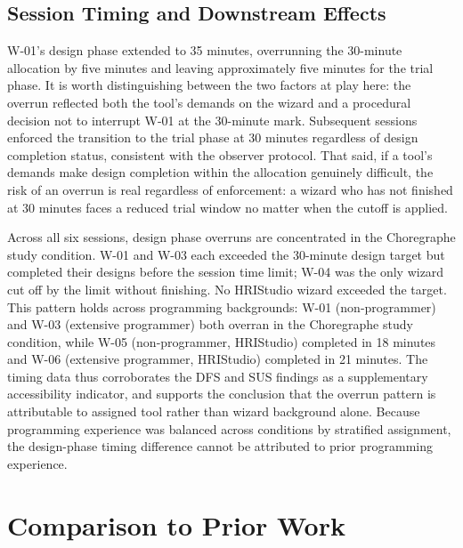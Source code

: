\subsection{Session Timing and Downstream Effects}

W-01's design phase extended to 35 minutes, overrunning the 30-minute allocation by five minutes and leaving approximately five minutes for the trial phase. It is worth distinguishing between the two factors at play here: the overrun reflected both the tool's demands on the wizard and a procedural decision not to interrupt W-01 at the 30-minute mark. Subsequent sessions enforced the transition to the trial phase at 30 minutes regardless of design completion status, consistent with the observer protocol. That said, if a tool's demands make design completion within the allocation genuinely difficult, the risk of an overrun is real regardless of enforcement: a wizard who has not finished at 30 minutes faces a reduced trial window no matter when the cutoff is applied.

Across all six sessions, design phase overruns are concentrated in the Choregraphe study condition. W-01 and W-03 each exceeded the 30-minute design target but completed their designs before the session time limit; W-04 was the only wizard cut off by the limit without finishing. No HRIStudio wizard exceeded the target. This pattern holds across programming backgrounds: W-01 (non-programmer) and W-03 (extensive programmer) both overran in the Choregraphe study condition, while W-05 (non-programmer, HRIStudio) completed in 18 minutes and W-06 (extensive programmer, HRIStudio) completed in 21 minutes. The timing data thus corroborates the DFS and SUS findings as a supplementary accessibility indicator, and supports the conclusion that the overrun pattern is attributable to assigned tool rather than wizard background alone. Because programming experience was balanced across conditions by stratified assignment, the design-phase timing difference cannot be attributed to prior programming experience.

\section{Comparison to Prior Work}

